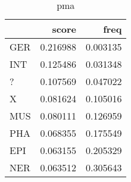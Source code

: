 \begin{table}[H]
\begin{center}
\begin{tabular}{lrr}
\toprule
 & score & freq \\
\midrule
GER & {\cellcolor[HTML]{2E924C}} \color[HTML]{F1F1F1} 0.216988 & {\cellcolor[HTML]{FFFFE5}} \color[HTML]{000000} 0.003135 \\
INT & {\cellcolor[HTML]{A1D889}} \color[HTML]{000000} 0.125486 & {\cellcolor[HTML]{F9FDC5}} \color[HTML]{000000} 0.031348 \\
? & {\cellcolor[HTML]{B8E293}} \color[HTML]{000000} 0.107569 & {\cellcolor[HTML]{F2FAB5}} \color[HTML]{000000} 0.047022 \\
X & {\cellcolor[HTML]{D6EFA2}} \color[HTML]{000000} 0.081624 & {\cellcolor[HTML]{BAE394}} \color[HTML]{000000} 0.105016 \\
MUS & {\cellcolor[HTML]{D7EFA2}} \color[HTML]{000000} 0.080111 & {\cellcolor[HTML]{9FD788}} \color[HTML]{000000} 0.126959 \\
PHA & {\cellcolor[HTML]{E1F3A9}} \color[HTML]{000000} 0.068355 & {\cellcolor[HTML]{5AB76A}} \color[HTML]{F1F1F1} 0.175549 \\
EPI & {\cellcolor[HTML]{E6F5AC}} \color[HTML]{000000} 0.063155 & {\cellcolor[HTML]{369D54}} \color[HTML]{F1F1F1} 0.205329 \\
NER & {\cellcolor[HTML]{E5F5AC}} \color[HTML]{000000} 0.063512 & {\cellcolor[HTML]{004529}} \color[HTML]{F1F1F1} 0.305643 \\
\bottomrule
\end{tabular}
\caption{pma}\end{center}\end{table}
